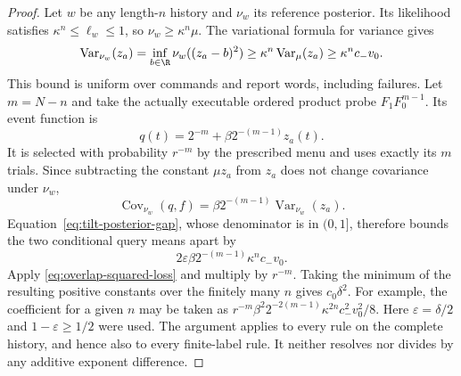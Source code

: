 \begin{proof}
Let $w$ be any length-$n$ history and $\nu_w$ its reference posterior.
Its likelihood satisfies $\kappa^n\le\ell_w\le1$, so
$\nu_w\ge\kappa^n\mu$. The variational formula for variance gives
\begin{equation}\label{eq:positive-posterior-variance}
 \operatorname{Var}_{\nu_w}(z_a)
 =\inf_{b\in\R}\nu_w((z_a-b)^2)
 \ge\kappa^n\operatorname{Var}_{\mu}(z_a)
 \ge\kappa^n c_- v_0.
\end{equation}
This bound is uniform over commands and report words, including failures.
Let $m=N-n$ and take the actually executable ordered product probe
$F_1F_0^{m-1}$. Its event function is
\[
 q(t)=2^{-m}+\beta 2^{-(m-1)}z_a(t).
\]
It is selected with probability $r^{-m}$ by the prescribed menu and
uses exactly its $m$ trials. Since subtracting the constant $\mu z_a$
from $z_a$ does not change covariance under $\nu_w$,
\[
 \operatorname{Cov}_{\nu_w}(q,f)
 =\beta 2^{-(m-1)}\operatorname{Var}_{\nu_w}(z_a).
\]
Equation~\eqref{eq:tilt-posterior-gap}, whose denominator is in
$(0,1]$, therefore bounds the two conditional query means apart by
\[
 2\varepsilon\beta 2^{-(m-1)}\kappa^n c_-v_0.
\]
Apply \eqref{eq:overlap-squared-loss} and multiply by $r^{-m}$.
Taking the minimum of the resulting positive constants over the finitely
many $n$ gives $c_0\delta^2$. For example, the coefficient for a given
$n$ may be taken as
$r^{-m}\beta^2 2^{-2(m-1)}\kappa^{2n}c_-^2v_0^2/8$.
Here $\varepsilon=\delta/2$ and $1-\varepsilon\ge1/2$ were used.
The argument applies to every rule on the complete history, and hence
also to every finite-label rule. It neither resolves nor divides by any
additive exponent difference.
\end{proof}

